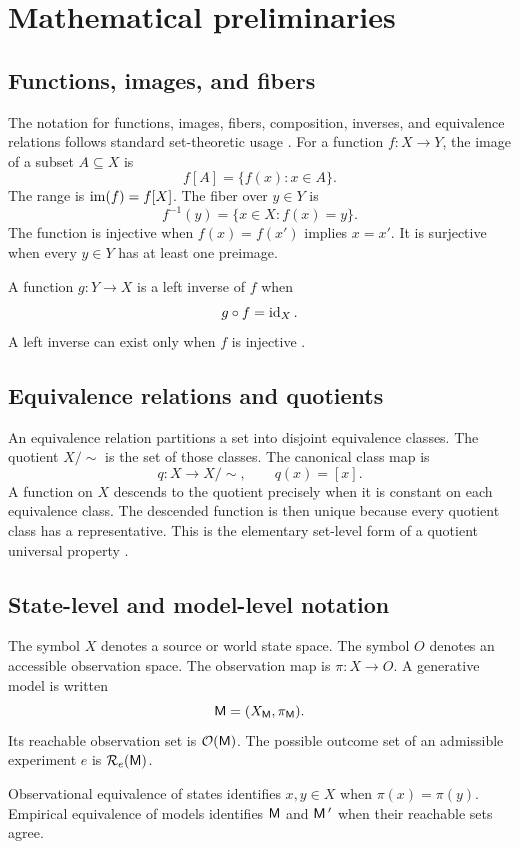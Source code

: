 \section{Mathematical preliminaries}
\label{sec:preliminaries}

\subsection{Functions, images, and fibers}

The notation for functions, images, fibers, composition, inverses, and equivalence relations follows standard set-theoretic usage \parencite[Chs. 8--11]{Halmos1974}. For a function \(f:X\to Y\), the image of a subset \(A\subseteq X\) is
\[
f[A]=\{f(x):x\in A\}.
\]
The range is \(\operatorname{im}(f)=f[X]\). The fiber over \(y\in Y\) is
\[
f^{-1}(y)=\{x\in X:f(x)=y\}.
\]
The function is injective when \(f(x)=f(x')\) implies \(x=x'\). It is surjective when every \(y\in Y\) has at least one preimage.

A function \(g:Y\to X\) is a left inverse of \(f\) when
\[
g\circ f=\operatorname{id}_X.
\]
A left inverse can exist only when \(f\) is injective \parencite[Chs. 1 and 4]{MacLaneBirkhoff1999}.

\subsection{Equivalence relations and quotients}

An equivalence relation partitions a set into disjoint equivalence classes. The quotient \(X/{\sim}\) is the set of those classes. The canonical class map is
\[
q:X\to X/{\sim},
\qquad
q(x)=[x].
\]
A function on \(X\) descends to the quotient precisely when it is constant on each equivalence class. The descended function is then unique because every quotient class has a representative. This is the elementary set-level form of a quotient universal property \parencite{MacLaneBirkhoff1999,Leinster2014}.

\subsection{State-level and model-level notation}

The symbol \(X\) denotes a source or world state space. The symbol \(O\) denotes an accessible observation space. The observation map is \(\pi:X\to O\). A generative model is written
\[
\mathsf M=(X_\mathsf M,\pi_\mathsf M).
\]
Its reachable observation set is \(\mathcal O(\mathsf M)\). The possible outcome set of an admissible experiment \(e\) is \(\mathcal R_e(\mathsf M)\).

Observational equivalence of states identifies \(x,y\in X\) when \(\pi(x)=\pi(y)\). Empirical equivalence of models identifies \(\mathsf M\) and \(\mathsf M\,^{\prime}\) when their reachable sets agree.




